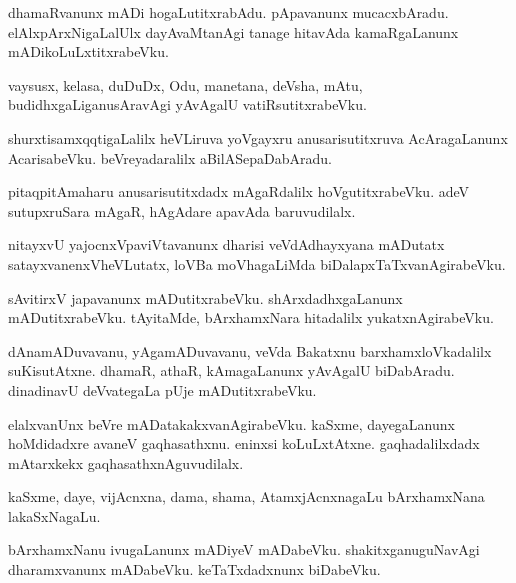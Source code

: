 \documentclass{article}
\begin{document}
\begin{mn}
dhamaRvanunx mADi hogaLutitxrabAdu. pApavanunx mucacxbAradu. elAlxpArxNigaLalUlx dayAvaMtanAgi 
tanage hitavAda kamaRgaLanunx mADikoLuLxtitxrabeVku.
\end{mn}

\begin{mn}
vaysusx, kelasa, duDuDx, Odu, manetana, deVsha, mAtu, budidhxgaLiganusAravAgi yAvAgalU 
vatiRsutitxrabeVku.
\end{mn}

\begin{mn}
shurxtisamxqqtigaLalilx heVLiruva yoVgayxru anusarisutitxruva AcAragaLanunx AcarisabeVku. 
beVreyadaralilx aBilASepaDabAradu.
\end{mn}

\begin{mn}
pitaqpitAmaharu anusarisutitxdadx mAgaRdalilx hoVgutitxrabeVku. adeV sutupxruSara mAgaR, hAgAdare
apavAda baruvudilalx.
\end{mn}

\begin{mn}
nitayxvU yajocnxVpaviVtavanunx dharisi veVdAdhayxyana mADutatx satayxvanenxVheVLutatx, loVBa 
moVhagaLiMda biDalapxTaTxvanAgirabeVku.
\end{mn}

\begin{mn}
sAvitirxV japavanunx mADutitxrabeVku. shArxdadhxgaLanunx mADutitxrabeVku. tAyitaMde, 
bArxhamxNara hitadalilx yukatxnAgirabeVku.
\end{mn}

\begin{mn}
dAnamADuvavanu, yAgamADuvavanu, veVda Bakatxnu barxhamxloVkadalilx suKisutAtxne. dhamaR, athaR, 
kAmagaLanunx yAvAgalU biDabAradu. dinadinavU deVvategaLa pUje mADutitxrabeVku.
\end{mn}

\begin{mn}
elalxvanUnx beVre mADatakakxvanAgirabeVku. kaSxme, dayegaLanunx hoMdidadxre avaneV gaqhasathxnu. 
eninxsi koLuLxtAtxne. gaqhadalilxdadx mAtarxkekx gaqhasathxnAguvudilalx.
\end{mn}

\begin{mn}
kaSxme, daye, vijAcnxna, dama, shama, AtamxjAcnxnagaLu bArxhamxNana lakaSxNagaLu. 
\end{mn}

\begin{mn}
bArxhamxNanu ivugaLanunx mADiyeV mADabeVku. shakitxganuguNavAgi dharamxvanunx mADabeVku. 
keTaTxdadxnunx biDabeVku.
\end{mn}
\end{document}
